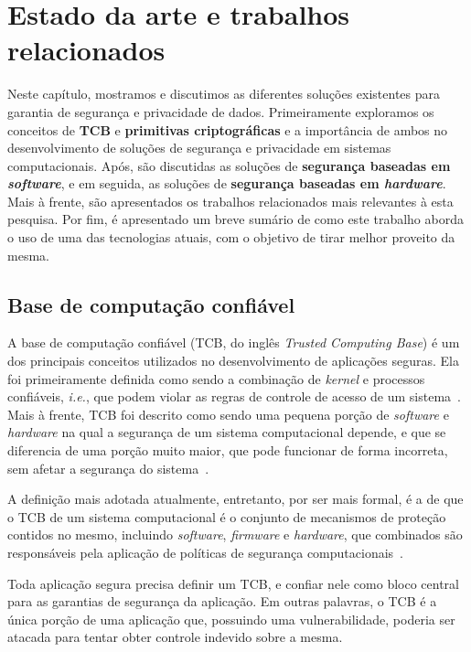 \chapter{Estado da arte e trabalhos relacionados}
\label{chapter:estadoarte}

Neste capítulo, mostramos e discutimos as diferentes soluções existentes
para garantia de segurança e privacidade de dados. Primeiramente exploramos os
conceitos de \textbf{TCB} e \textbf{primitivas criptográficas} e a importância
de ambos no desenvolvimento de soluções de segurança e privacidade em sistemas
computacionais. Após, são discutidas as soluções de \textbf{segurança baseadas
em \textit{software}}, e em seguida, as soluções de \textbf{segurança baseadas
em \textit{hardware}}. Mais à frente, são apresentados os trabalhos relacionados
mais relevantes à esta pesquisa. Por fim, é apresentado um breve sumário de como
este trabalho aborda o uso de uma das tecnologias atuais, com o objetivo de
tirar melhor proveito da mesma.

\section{Base de computação confiável}
\label{sec:estadoarte_tcb}

A base de computação confiável (TCB, do inglês \textit{Trusted Computing Base})
é um dos principais conceitos utilizados no desenvolvimento de aplicações
seguras. Ela foi primeiramente definida como sendo a combinação de \textit
{kernel} e processos confiáveis, \textit{i.e.}, que podem violar as regras de
controle de acesso de um sistema~\cite{rushby1981design}. Mais à frente, TCB foi
descrito como sendo uma pequena porção de \textit{software} e \textit{hardware}
na qual a segurança de um sistema computacional depende, e que se diferencia de
uma porção muito maior, que pode funcionar de forma incorreta, sem afetar a
segurança do sistema~\cite{lampson1992authentication}.

A definição mais adotada atualmente, entretanto, por ser mais formal, é a de que
o TCB de um sistema computacional é o conjunto de mecanismos de proteção
contidos no mesmo, incluindo \textit{software}, \textit{firmware} e \textit
{hardware}, que combinados são responsáveis pela aplicação de políticas de
segurança computacionais~\cite{qiu1985trusted}.

Toda aplicação segura precisa definir um TCB, e confiar nele como bloco central
para as garantias de segurança da aplicação. Em outras palavras, o TCB é a única
porção de uma aplicação que, possuindo uma vulnerabilidade, poderia ser atacada
para tentar obter controle indevido sobre a mesma.

